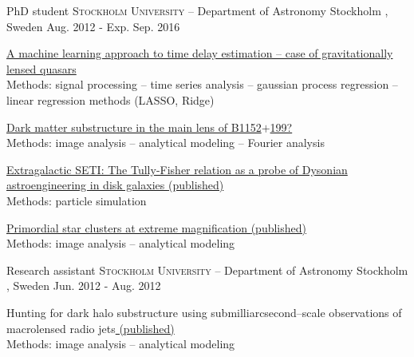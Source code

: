\begin{cventries}
  \cventry
    {\normalsize PhD student}
    {\textsc{Stockholm University} -- Department of Astronomy}
    {\normalsize Stockholm , Sweden}
    {Aug. 2012 - Exp. Sep. 2016}
    {
      \begin{cvitems}
        \item \small{\href{https://github.com/asadisaghar/TimeDelay}{ A machine learning approach to time delay estimation -- case of gravitationally lensed quasars}} \\
        \normalsize{Methods: signal processing -- time series analysis -- gaussian process regression -- linear regression methods (LASSO, Ridge)}
        \item \small{\href{https://github.com/asadisaghar/B1152199}{ Dark matter substructure in the main lens of B1152$+$199?}} \\
        \normalsize{Methods: image analysis -- analytical modeling -- Fourier analysis}
        \item \href{https://github.com/asadisaghar/SETI}{  Extragalactic SETI: The Tully-Fisher relation as a probe of Dysonian astroengineering in disk galaxies }\small{\href{http://iopscience.iop.org/article/10.1088/0004-637X/810/1/23/meta}{ (published)}} \\
        \normalsize{Methods: particle simulation}
        \item \href{https://github.com/asadisaghar/extreme\_magnification}{ Primordial star clusters at extreme magnification }\small{\href{http://mnras.oxfordjournals.org/content/449/3/3057 }{ (published)}} \\
        \normalsize{Methods: image analysis -- analytical modeling}
      \end{cvitems}
    }
  \cventry
    {\normalsize Research assistant}
    {\textsc{Stockholm University} -- Department of Astronomy}
    {\normalsize Stockholm , Sweden}
    {\normalsize Jun. 2012 - Aug. 2012}
    {
      \begin{cvitems}
        \item Hunting for dark halo substructure using submilliarcsecond--scale observations of macrolensed radio jets\small {\href{http://mnras.oxfordjournals.org/content/431/3/2172}{ (published)}} \\
        \normalsize{Methods: image analysis -- analytical modeling}
      \end{cvitems}
    }
\end{cventries}
